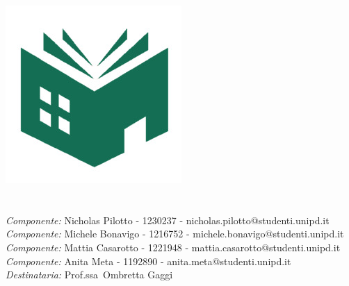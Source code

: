 \makeatletter
    \begin{titlepage}
        \begin{center}
            \includegraphics[width=0.4\linewidth]{images/icon.jpg}\\[10ex]
            {\huge \bfseries  \@title }\\[5ex]
            {\large \@date} \\[10ex]
            {\large \textit{Componente:} Nicholas Pilotto - 1230237 - nicholas.pilotto@studenti.unipd.it} \\[2ex]
            {\large \textit{Componente:} Michele Bonavigo - 1216752 - michele.bonavigo@studenti.unipd.it} \\[2ex]
            {\large \textit{Componente:} Mattia Casarotto - 1221948 - mattia.casarotto@studenti.unipd.it} \\[2ex]
            {\large \textit{Componente:} Anita Meta - 1192890 - anita.meta@studenti.unipd.it} \\[2ex]
            {\large \textit{Destinataria:} Prof.ssa\ Ombretta Gaggi} \\[2ex]
        \end{center}
    \end{titlepage}
\makeatother
\thispagestyle{empty}
\newpage